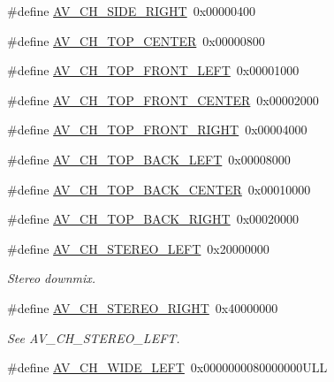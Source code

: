 \begin{DoxyCompactItemize}
\#define \hyperlink{group__channel__masks_ga947b60ab70c428ebb07c8b9c87023b39}{A\+V\+\_\+\+C\+H\+\_\+\+S\+I\+D\+E\+\_\+\+R\+I\+G\+HT}~0x00000400
\item 
\#define \hyperlink{group__channel__masks_ga922199ce7638a651d66a423379b4c5dc}{A\+V\+\_\+\+C\+H\+\_\+\+T\+O\+P\+\_\+\+C\+E\+N\+T\+ER}~0x00000800
\item 
\#define \hyperlink{group__channel__masks_ga352bec66d2e1bef67efe5b7f0a4207f3}{A\+V\+\_\+\+C\+H\+\_\+\+T\+O\+P\+\_\+\+F\+R\+O\+N\+T\+\_\+\+L\+E\+FT}~0x00001000
\item 
\#define \hyperlink{group__channel__masks_ga6b558fe85e67383a5b04e56b97b145d0}{A\+V\+\_\+\+C\+H\+\_\+\+T\+O\+P\+\_\+\+F\+R\+O\+N\+T\+\_\+\+C\+E\+N\+T\+ER}~0x00002000
\item 
\#define \hyperlink{group__channel__masks_gabce29ea1d7e2d433263b2cbf28232360}{A\+V\+\_\+\+C\+H\+\_\+\+T\+O\+P\+\_\+\+F\+R\+O\+N\+T\+\_\+\+R\+I\+G\+HT}~0x00004000
\item 
\#define \hyperlink{group__channel__masks_gaac082f244f37f9c5d8e4f7bf96cc76dc}{A\+V\+\_\+\+C\+H\+\_\+\+T\+O\+P\+\_\+\+B\+A\+C\+K\+\_\+\+L\+E\+FT}~0x00008000
\item 
\#define \hyperlink{group__channel__masks_ga439a8664c452f9782b460f61a3908451}{A\+V\+\_\+\+C\+H\+\_\+\+T\+O\+P\+\_\+\+B\+A\+C\+K\+\_\+\+C\+E\+N\+T\+ER}~0x00010000
\item 
\#define \hyperlink{group__channel__masks_ga8fa88c3c74339f4218a3e70286fdbdaa}{A\+V\+\_\+\+C\+H\+\_\+\+T\+O\+P\+\_\+\+B\+A\+C\+K\+\_\+\+R\+I\+G\+HT}~0x00020000
\item 
\#define \hyperlink{group__channel__masks_gaea8f62dcaa4774307a8fa9b52172c688}{A\+V\+\_\+\+C\+H\+\_\+\+S\+T\+E\+R\+E\+O\+\_\+\+L\+E\+FT}~0x20000000
\begin{DoxyCompactList}\small\item\em Stereo downmix. \end{DoxyCompactList}\item 
\#define \hyperlink{group__channel__masks_gab68e7edb9182b1b22898b960707143c1}{A\+V\+\_\+\+C\+H\+\_\+\+S\+T\+E\+R\+E\+O\+\_\+\+R\+I\+G\+HT}~0x40000000
\begin{DoxyCompactList}\small\item\em See A\+V\+\_\+\+C\+H\+\_\+\+S\+T\+E\+R\+E\+O\+\_\+\+L\+E\+FT. \end{DoxyCompactList}\item 
\#define \hyperlink{group__channel__masks_ga11e273c4872335063b5059cca52218c0}{A\+V\+\_\+\+C\+H\+\_\+\+W\+I\+D\+E\+\_\+\+L\+E\+FT}~0x0000000080000000\+U\+LL

\end{DoxyCompactItemize}
